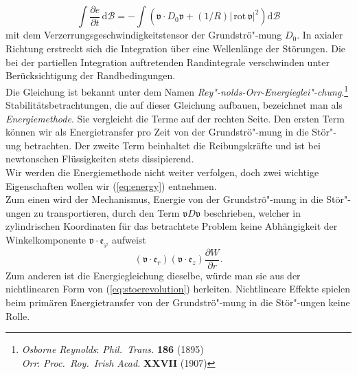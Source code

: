 \documentclass[10pt,a5paper,oneside,draft]{book}
\numberwithin{equation}{chapter}
\def\bibspace{\hspace*{18pt}}
\def\bibspace{\hspace*{21pt}}
\begin{document}
\begin{equation}\label{eq:energy}
	\int  \frac{\partial{e}}{\partial t} \, \mathrm{d} \mathcal{B} = -\int \left( \mathfrak{v} \cdot D_0 \mathfrak{v} + (1/R) | \,\mathrm{rot}\,\mathfrak{v}|^2 \right) \mathrm{d} \mathcal{B}
\end{equation}
mit dem Verzerrungsgeschwindigkeitstensor der Grundstr\"o"-mung $D_0$.
In axialer Richtung erstreckt sich die Integration \"uber eine Wellenl\"ange der St\"orungen.
Die bei der partiellen Integration auftretenden Randintegrale verschwinden unter Ber\"ucksichtigung der Randbedingungen.\\

Die Gleichung ist bekannt unter dem Namen \textsl{Rey"-nolds-Orr-Energieglei"-chung}.\footnote{\label{bib:reynolds_criterion:2}\textsl{Osborne Reynolds}: \textit{Phil.\ Trans.} \textbf{186} (1895)\\\bibspace\label{bib:orr:2}\textsl{Orr}: \textit{Proc.\ Roy.\ Irish Acad.} \textbf{XXVII} (1907)}
Stabilit\"atsbetrachtungen, die auf dieser Gleichung aufbauen, bezeichnet man als \textit{Energiemethode}.
Sie vergleicht die Terme auf der rechten Seite.
Den ersten Term k\"onnen wir als Energietransfer pro Zeit von der Grundstr\"o"-mung in die St\"or"-ung betrachten.
Der zweite Term beinhaltet die Reibungskr\"afte und ist bei newtonschen Fl\"ussigkeiten stets dissipierend.\\
Wir werden die Energiemethode nicht weiter verfolgen, doch zwei wichtige Eigenschaften wollen wir (\mbox{\ref{eq:energy}}) entnehmen.\\
Zum einen wird der Mechanismus, Energie von der Grundstr\"o"-mung in die St\"or"-ungen zu transportieren, durch den Term $\mathfrak{v} D \mathfrak{v}$ beschrieben, welcher in zylindrischen Koordinaten f\"ur das betrachtete Problem keine Abh\"angigkeit der Winkelkomponente $\mathfrak{v}\cdot\mathfrak{e}_\varphi$ aufweist 
\begin{equation}\label{eq:interaktion}
	 (\mathfrak{v}\cdot\mathfrak{e}_r) (\mathfrak{v}\cdot\mathfrak{e}_z)  \frac{\partial{W}}{\partial r} .
\end{equation}
Zum anderen ist die Energiegleichung dieselbe, w\"urde man sie aus der nichtlinearen Form von (\mbox{\ref{eq:stoerevolution}}) herleiten.
Nichtlineare Effekte spielen beim prim\"aren Energietransfer von der Grundstr\"o"-mung in die St\"or"-ungen keine Rolle.\\
\end{document}
